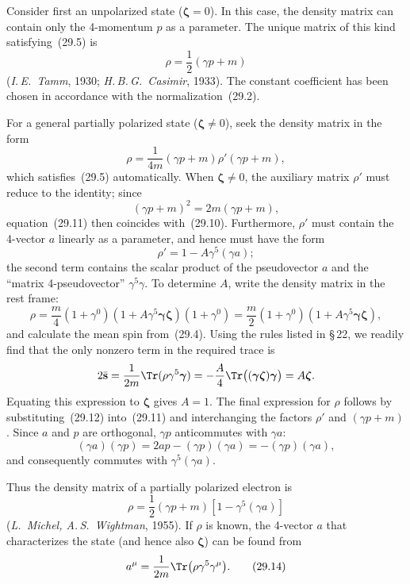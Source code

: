 Consider first an unpolarized state ($\boldsymbol{\zeta} = 0$). In this case, the density matrix can contain only the 4-momentum $p$ as a parameter. The unique matrix of this kind satisfying~(29.5) is
\begin{equation}
\rho = \frac{1}{2}(\gamma p + m)
\tag{29.10}
\end{equation}
(\emph{I.\,E.~Tamm}, 1930; \emph{H.\,B.\,G.~Casimir}, 1933). The constant coefficient has been chosen in accordance with the normalization~(29.2).


For a general partially polarized state ($\boldsymbol{\zeta} \neq 0$), seek the density matrix in the form
\begin{equation}
\rho = \frac{1}{4m}(\gamma p + m)\rho'(\gamma p + m),
\tag{29.11}
\end{equation}
which satisfies~(29.5) automatically. When $\boldsymbol{\zeta} \neq 0$, the auxiliary matrix $\rho'$ must reduce to the identity; since
\[
(\gamma p + m)^2 = 2m(\gamma p + m),
\]
equation~(29.11) then coincides with~(29.10). Furthermore, $\rho'$ must contain the 4-vector $a$ linearly as a parameter, and hence must have the form
\begin{equation}
\rho' = 1 - A\gamma^5(\gamma a);
\tag{29.12}
\end{equation}
the second term contains the scalar product of the pseudovector $a$ and the ``matrix 4-pseudovector'' $\gamma^5\gamma$. To determine $A$, write the density matrix in the rest frame:
\[
\rho = \frac{m}{4}(1 + \gamma^0)(1 + A\gamma^5\boldsymbol{\gamma}\boldsymbol{\zeta})(1 + \gamma^0) = \frac{m}{2}(1 + \gamma^0)(1 + A\gamma^5\boldsymbol{\gamma}\boldsymbol{\zeta}),
\]
and calculate the mean spin from~(29.4). Using the rules listed in \S\,22, we readily find that the only nonzero term in the required trace is
\[
2\bar{\mathbf{s}} = \frac{1}{2m}\Tr(\rho\gamma^5\boldsymbol{\gamma}) = -\frac{A}{4}\Tr\bigl((\boldsymbol{\gamma}\boldsymbol{\zeta})\boldsymbol{\gamma}\bigr) = A\boldsymbol{\zeta}.
\]
Equating this expression to $\boldsymbol{\zeta}$ gives $A = 1$. The final expression for $\rho$ follows by substituting~(29.12) into~(29.11) and interchanging the factors $\rho'$ and $(\gamma p + m)$. Since $a$ and $p$ are orthogonal, $\gamma p$ anticommutes with $\gamma a$:
\[
(\gamma a)(\gamma p) = 2ap - (\gamma p)(\gamma a) = -(\gamma p)(\gamma a),
\]
and consequently commutes with $\gamma^5(\gamma a)$.

Thus the density matrix of a partially polarized electron is
\begin{equation}
\rho = \frac{1}{2}(\gamma p + m)[1 - \gamma^5(\gamma a)]
\tag{29.13}
\end{equation}
(\emph{L.~Michel, A.\,S.~Wightman}, 1955). If $\rho$ is known, the 4-vector $a$ that characterizes the state (and hence also $\boldsymbol{\zeta}$) can be found from
\begin{equation}
a^\mu = \frac{1}{2m}\Tr\bigl(\rho\gamma^5\gamma^\mu\bigr).
\tag{29.14}
\end{equation}

